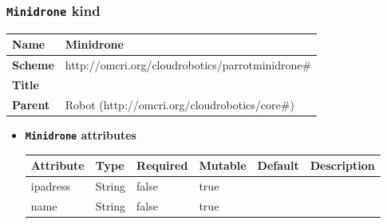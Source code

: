 \subsubsection{\texttt{Minidrone} kind}
\begin{center}
\begin{tabular}{|l|l|}
  \hline
  \textbf{Name} & Minidrone \\
  \hline  
  \textbf{Scheme} & http://omcri.org/cloudrobotics/parrotminidrone\# \\
  \hline
  \textbf{Title} &  \\
  \hline
  \textbf{Parent} & Robot (http://omcri.org/cloudrobotics/core\#) \\
  \hline
\end{tabular}
\end{center}
\begin{itemize}
\item \textbf{\texttt{Minidrone} attributes}

\begin{tabularx}{\textwidth}{|l|l|p{1.4cm}|p{1.3cm}|l|X|}
  \hline
  \textbf{Attribute} & \textbf{Type} & \textbf{Required} & \textbf{Mutable} & \textbf{Default} & \textbf{Description} \\
  \hline  
  ipadress & String & false & true &  &  \\
  \hline
  name & String & false & true &  &  \\
  \hline
\end{tabularx}
\end{itemize}



